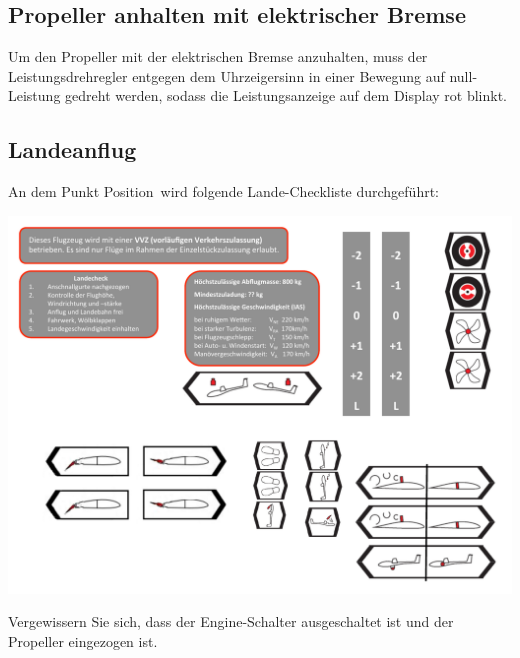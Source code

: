 \subsection{Propeller anhalten mit elektrischer Bremse}
Um den Propeller mit der elektrischen Bremse anzuhalten, muss der Leistungsdrehregler entgegen dem Uhrzeigersinn in einer Bewegung auf null-Leistung gedreht werden, sodass die Leistungsanzeige auf dem Display rot blinkt.

\newpage
\subsection{Landeanflug}
An dem Punkt \glqq Position\grqq\ wird folgende Lande-Checkliste durchgeführt:
\newline
\begin{center}
\includegraphics[width=.45\textwidth]{bilder/landecheck.pdf}
\end{center}

Vergewissern Sie sich, dass der \glqq Engine\grqq-Schalter ausgeschaltet ist und der Propeller eingezogen ist.\\

